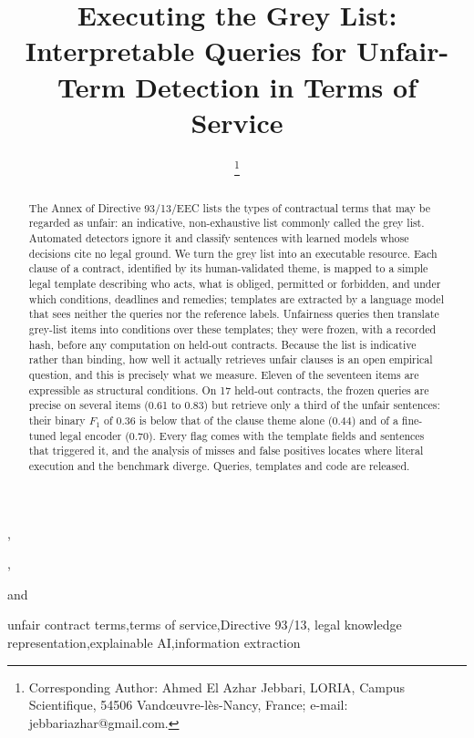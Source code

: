 \documentclass{IOS-Book-Article}
\begin{document}
\begin{frontmatter}
\title{Executing the Grey List: Interpretable Queries for Unfair-Term Detection in Terms of Service}
\author[A]{ %
\thanks{Corresponding Author: Ahmed El Azhar Jebbari, LORIA, Campus Scientifique, 54506 Vandœuvre-lès-Nancy, France; e-mail: jebbariazhar@gmail.com.}},
\author[A]{ },
\author[B]{ }
and
\author[C]{ }
\address[A]{LORIA, Université de Lorraine, CNRS, Inria, Nancy, France}
\address[B]{Juristiadata, France}
\address[C]{Faculty of Legal Sciences, Rabat, Morocco}

\begin{abstract}
The Annex of Directive 93/13/EEC lists the types of contractual terms that may be regarded as unfair: an indicative, non-exhaustive list commonly called the grey list. Automated detectors ignore it and classify sentences with learned models whose decisions cite no legal ground. We turn the grey list into an executable resource. Each clause of a contract, identified by its human-validated theme, is mapped to a simple legal template describing who acts, what is obliged, permitted or forbidden, and under which conditions, deadlines and remedies; templates are extracted by a language model that sees neither the queries nor the reference labels. Unfairness queries then translate grey-list items into conditions over these templates; they were frozen, with a recorded hash, before any computation on held-out contracts. Because the list is indicative rather than binding, how well it actually retrieves unfair clauses is an open empirical question, and this is precisely what we measure. Eleven of the seventeen items are expressible as structural conditions. On 17 held-out contracts, the frozen queries are precise on several items (0.61 to 0.83) but retrieve only a third of the unfair sentences: their binary $F_1$ of 0.36 is below that of the clause theme alone (0.44) and of a fine-tuned legal encoder (0.70). Every flag comes with the template fields and sentences that triggered it, and the analysis of misses and false positives locates where literal execution and the benchmark diverge. Queries, templates and code are released.
\end{abstract}

\begin{keyword}
unfair contract terms\sep terms of service\sep Directive 93/13\sep
legal knowledge representation\sep explainable AI\sep information extraction
\end{keyword}
\end{frontmatter}
\end{document}
